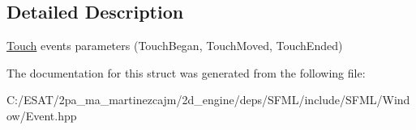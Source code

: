 \subsection{Detailed Description}
\hyperlink{classsf_1_1_touch}{Touch} events parameters (Touch\+Began, Touch\+Moved, Touch\+Ended) 

The documentation for this struct was generated from the following file\+:\begin{DoxyCompactItemize}
\item 
C\+:/\+E\+S\+A\+T/2pa\+\_\+ma\+\_\+martinezcajm/2d\+\_\+engine/deps/\+S\+F\+M\+L/include/\+S\+F\+M\+L/\+Window/Event.\+hpp\end{DoxyCompactItemize}
